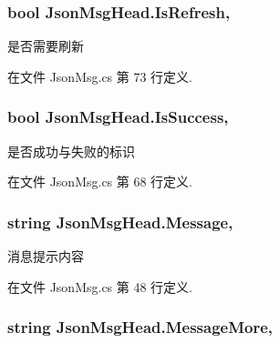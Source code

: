 \hypertarget{class_json_msg_head_a2f7ab4b4950d59559dc61dbe85ab6e83}{
\subsubsection[{Is\-Refresh}]{\setlength{\rightskip}{0pt plus 5cm}bool Json\-Msg\-Head.\-Is\-Refresh\hspace{0.3cm}{\ttfamily [get]}, {\ttfamily [set]}}}\label{class_json_msg_head_a2f7ab4b4950d59559dc61dbe85ab6e83}


是否需要刷新 



在文件 Json\-Msg.\-cs 第 73 行定义.

\hypertarget{class_json_msg_head_ae469a6cdc43ba8a305f1ea0f738fefb2}{
\subsubsection[{Is\-Success}]{\setlength{\rightskip}{0pt plus 5cm}bool Json\-Msg\-Head.\-Is\-Success\hspace{0.3cm}{\ttfamily [get]}, {\ttfamily [set]}}}\label{class_json_msg_head_ae469a6cdc43ba8a305f1ea0f738fefb2}


是否成功与失败的标识 



在文件 Json\-Msg.\-cs 第 68 行定义.

\hypertarget{class_json_msg_head_a383ce85bc63ef51d4efb9c6f16324d39}{
\subsubsection[{Message}]{\setlength{\rightskip}{0pt plus 5cm}string Json\-Msg\-Head.\-Message\hspace{0.3cm}{\ttfamily [get]}, {\ttfamily [set]}}}\label{class_json_msg_head_a383ce85bc63ef51d4efb9c6f16324d39}


消息提示内容 



在文件 Json\-Msg.\-cs 第 48 行定义.

\hypertarget{class_json_msg_head_a2119772449e6dfa14eb675b3c79a40bb}{
\subsubsection[{Message\-More}]{\setlength{\rightskip}{0pt plus 5cm}string Json\-Msg\-Head.\-Message\-More\hspace{0.3cm}{\ttfamily [get]}, {\ttfamily [set]}}}\label{class_json_msg_head_a2119772449e6dfa14eb675b3c79a40bb}


